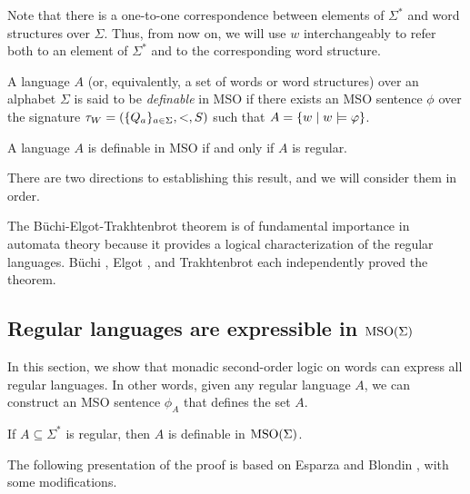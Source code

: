 \documentclass[11pt,twoside=off,numbers=noenddot]{scrbook}
\begin{document}
\begin{abuse}
  Note that there is a one-to-one correspondence between elements of
  $\Sigma^\ast$ and word structures over $\Sigma$. Thus, from now on,
  we will use $w$ interchangeably to refer both to an element of
  $\Sigma^\ast$ and to the corresponding word structure.
\end{abuse}

\begin{definition}
  A language $A$ (or, equivalently, a set of words or word
  structures) over an alphabet $\Sigma$ is said to be
  \emph{definable} in MSO if there exists an MSO sentence $\phi$ over
  the signature $\tau_W = (\{ Q_a \}_{a \in \Sigma}, <, S)$ such that
  $A = \{ w \mid w \models \varphi \}$.
\end{definition}

\begin{theorem}
  A language $A$ is definable in MSO if and only if $A$ is regular.
\end{theorem}

There are two directions to establishing this result, and we will
consider them in order.

\begin{remark}
  The Büchi-Elgot-Trakhtenbrot theorem is of fundamental importance
  in automata theory because it provides a logical characterization
  of the regular languages. Büchi \cite{buchi1960weak}, Elgot
  \cite{elgot1961decision}, and Trakhtenbrot
  \cite{trakhtenbrot1962finite} each independently proved the theorem.
\end{remark}

\subsection{Regular languages are expressible in $\text{MSO}(\Sigma)$}
In this section, we show that monadic second-order logic on words can
express all regular languages. In other words, given any regular
language $A$, we can construct an MSO sentence $\phi_A$ that defines
the set $A$.

\begin{lemma}
  If $A \subseteq \Sigma^\ast$ is regular, then $A$ is definable in
  $\text{MSO}(\Sigma)$.
\end{lemma}

The following presentation of the proof is based on Esparza and
Blondin \cite{esparza2023automata}, with some modifications.
\end{document}

